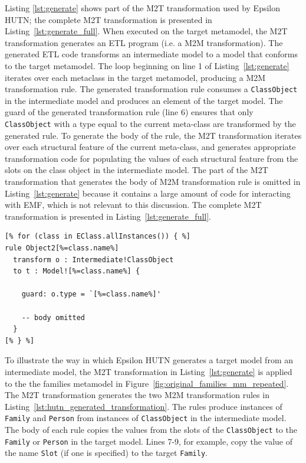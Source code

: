 Listing \ref{lst:generate} shows part of the M2T transformation used by Epsilon HUTN; the complete M2T transformation is presented in Listing~\ref{lst:generate_full}. When executed on the target metamodel, the M2T transformation generates an ETL program (i.e. a M2M transformation). The generated ETL code transforms an intermediate model to a model that conforms to the target metamodel. The loop beginning on line 1 of Listing~\ref{lst:generate} iterates over each metaclass in the target metamodel, producing a M2M transformation rule. The generated transformation rule consumes a \texttt{Cl\-a\-ssOb\-je\-ct} in the intermediate model and produces an element of the target model. The guard of the generated transformation rule (line 6) ensures that only \texttt{Cl\-a\-ssOb\-je\-ct} with a type equal to the current meta-class are transformed by the generated rule. To generate the body of the rule, the M2T transformation iterates over each structural feature of the current meta-class, and generates appropriate transformation code for populating the values of each structural feature from the slots on the class object in the intermediate model. The part of the M2T transformation that generates the body of M2M transformation rule is omitted in Listing~\ref{lst:generate} because it contains a large amount of code for interacting with EMF, which is not relevant to this discussion. The complete M2T transformation is presented in Listing~\ref{lst:generate_full}.

\begin{lstlisting}[caption={[Higher-order transformation with EGL]Part of the M2T transformation (in EGL) that takes a target metamodel and generates an intermediate model to target model transformation (in ETL).}, label=lst:generate, language=EGL]
[% for (class in EClass.allInstances()) { %]
rule Object2[%=class.name%]
  transform o : Intermediate!ClassObject
  to t : Model![%=class.name%] {

    guard: o.type = `[%=class.name%]'

    -- body omitted
  }
[% } %]
\end{lstlisting}

To illustrate the way in which Epsilon HUTN generates a target model from an intermediate model, the M2T transformation in Listing~\ref{lst:generate} is applied to the the families metamodel in Figure~\ref{fig:original_families_mm_repeated}. The M2T transformation generates the two M2M transformation rules in Listing~\ref{lst:hutn_generated_transformation}. The rules produce instances of \texttt{Fa\-mi\-ly} and \texttt{Pe\-rs\-on} from instances of \texttt{Cl\-a\-ssOb\-je\-ct} in the intermediate model. The body of each rule copies the values from the slots of the \texttt{Cl\-as\-sOb\-je\-ct} to the \texttt{Fa\-mi\-ly} or \texttt{Pe\-rs\-on} in the target model. Lines 7-9, for example, copy the value of the name \texttt{Sl\-ot} (if one is specified) to the target \texttt{Fa\-mi\-ly}.

